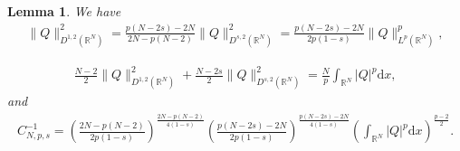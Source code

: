 \documentclass[12pt,a4paper,reqno]{amsart}
\numberwithin{equation}{section}
\newtheorem{lemma}{Lemma}[section]
\begin{document}
\begin{lemma}\label{Lemma3.5}
We have
\begin{equation*}
\begin{aligned}
\|Q\|_{D^{1,2}(\mathbb{R}^{N})}^{2}
=
\frac{p(N-2s)-2N}{2N-p(N-2)}
\|Q\|_{D^{s,2}(\mathbb{R}^{N})}^{2}
=
\frac{p(N-2s)-2N}{2p(1-s)}
\|Q\|_{L^{p}(\mathbb{R}^{N})}^{p},
\end{aligned}
\end{equation*}

\begin{equation*}
\begin{aligned}
\frac{N-2}{2}
\|Q\|^{2}_{D^{1,2}(\mathbb{R}^{N})}
+
\frac{N-2s}{2}
\|Q\|^{2}_{D^{s,2}(\mathbb{R}^{N})}
=\frac{N}{p}\int_{\mathbb{R}^{N}}|Q|^{p}\mathrm{d}x,
\end{aligned}
\end{equation*}
and
\begin{equation*}
\begin{aligned}
C_{N,p,s}^{-1}=
\left(
\frac{2N-p(N-2)}{2p(1-s)}
\right)
^{\frac{2N-p(N-2)}{4(1-s)}}
\left(
\frac{p(N-2s)-2N}{2p(1-s)}
\right)
^{\frac{p(N-2s)-2N}{4(1-s)}}
\left(
\int_{\mathbb{R}^{N}}
|Q|^{p}
\mathrm{d}x
\right)^{\frac{p-2}{2}}.
\end{aligned}
\end{equation*}
\end{lemma}
\end{document}
